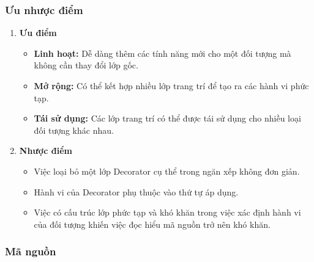 \subsubsection{Ưu nhược điểm}
\begin{enumerate}
    \item \textbf{Ưu điểm}
          \begin{itemize}
              \item \textbf{Linh hoạt:} Dễ dàng thêm các tính năng mới cho một đối tượng mà không cần thay đổi lớp gốc.
              \item \textbf{Mở rộng:} Có thể kết hợp nhiều lớp trang trí để tạo ra các hành vi phức tạp.
              \item \textbf{Tái sử dụng:} Các lớp trang trí có thể được tái sử dụng cho nhiều loại đối tượng khác nhau.
          \end{itemize}
    \item \textbf{Nhược điểm}
          \begin{itemize}
              \item Việc loại bỏ một lớp Decorator cụ thể trong ngăn xếp không đơn giản.
              \item Hành vi của Decorator phụ thuộc vào thứ tự áp dụng.
              \item Việc có cấu trúc lớp phức tạp và khó khăn trong việc xác định hành vi của đối tượng khiến việc đọc hiểu mã nguồn trở nên khó khăn.
          \end{itemize}
\end{enumerate}

\subsubsection{Mã nguồn}
